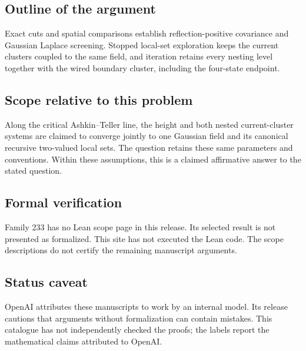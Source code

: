 \documentclass[11pt]{article}
\begin{document}
\subsection{Outline of the argument}
Exact cuts and spatial comparisons establish reflection-positive covariance and Gaussian Laplace screening. Stopped local-set exploration keeps the current clusters coupled to the same field, and iteration retains every nesting level together with the wired boundary cluster, including the four-state endpoint.

\subsection{Scope relative to this problem}
Along the critical Ashkin--Teller line, the height and both nested current-cluster systems are claimed to converge jointly to one Gaussian field and its canonical recursive two-valued local sets. The question retains these same parameters and conventions. Within these assumptions, this is a claimed affirmative answer to the stated question.

\subsection{Formal verification}
Family 233 has no Lean scope page in this release. Its selected result is not presented as formalized. This site has not executed the Lean code. The scope descriptions do not certify the remaining manuscript arguments.

\subsection{Status caveat}
OpenAI attributes these manuscripts to work by an internal model. Its release cautions that arguments without formalization can contain mistakes. This catalogue has not independently checked the proofs; the labels report the mathematical claims attributed to OpenAI.
\end{document}
